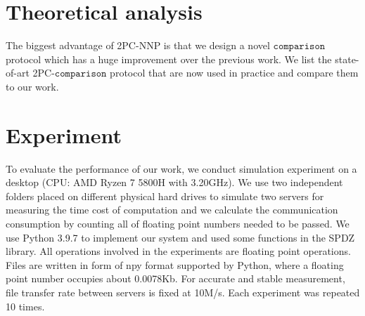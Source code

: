 \documentclass[letterpaper]{article} %
\begin{document}
    \section{Theoretical analysis}
    The biggest advantage of 2PC-NNP is that we design a novel $\mathtt{comparison}$ protocol which has 
    a huge improvement over the previous work.
    We list the state-of-art 2PC-$\mathtt{comparison}$ protocol that are now used in practice and compare them to our work.

    \begin{table}[!ht]
    
        \center

        \caption{Experiment II-Layers consumption}
        \label{Overhead of methods}
    \end{table}


    \section{Experiment}
    To evaluate the performance of our work, we conduct simulation experiment on a desktop (CPU: AMD Ryzen 7 5800H with 3.20GHz).
    We use two independent folders placed on different physical hard drives to simulate 
    two servers for measuring the time cost of computation 
    and we calculate the communication consumption by counting all of floating point numbers needed to be passed.
    We use Python 3.9.7 to implement our system and used some functions in the SPDZ library.%
    All operations involved in the experiments are floating point operations.
    Files are written in form of npy format supported by Python, where a floating point number occupies about 0.0078Kb.
    For accurate and stable measurement, file transfer rate between servers is fixed at 10M/s.
    Each experiment was repeated 10 times.
\end{document}
